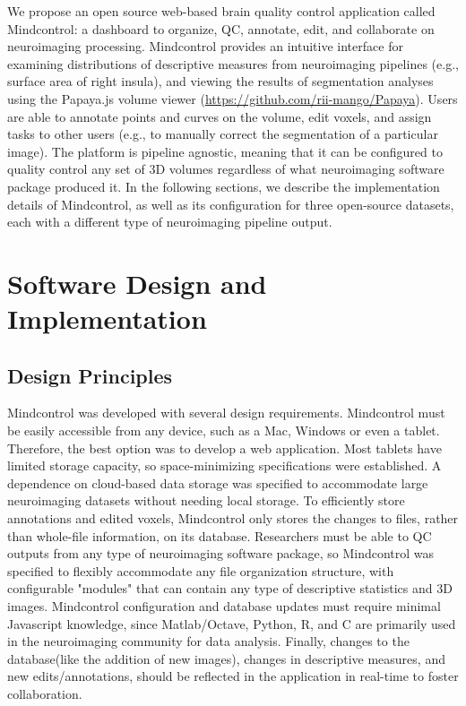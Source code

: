 We propose an open source web-based brain quality control application called Mindcontrol: a dashboard to organize, QC, annotate, edit, and collaborate on neuroimaging processing. Mindcontrol provides an intuitive interface for examining distributions of descriptive measures from neuroimaging pipelines (e.g., surface area of right insula), and viewing the results of segmentation analyses using the Papaya.js volume viewer (\href{https://github.com/rii-mango/Papaya}{https://github.com/rii-mango/Papaya}). Users are able to annotate points and curves on the volume, edit voxels, and assign tasks to other users (e.g., to manually correct the segmentation of a particular image). The platform is pipeline agnostic, meaning that it can be configured to quality control any set of 3D volumes regardless of what neuroimaging software package produced it. In the following sections, we describe the implementation details of Mindcontrol, as well as its configuration for three open-source datasets, each with a different type of neuroimaging pipeline output. 

\section{Software Design and Implementation}

\subsection{Design Principles}
Mindcontrol was developed with several design requirements. Mindcontrol must be easily accessible from any device, such as a Mac, Windows or even a tablet. Therefore, the best option was to develop a web application. Most tablets have limited storage capacity, so space-minimizing specifications were established. A dependence on cloud-based data storage was specified to accommodate large neuroimaging datasets without needing local storage. To efficiently store annotations and edited voxels, Mindcontrol only stores the changes to files, rather than whole-file information, on its database. Researchers must be able to QC outputs from any type of neuroimaging software package, so Mindcontrol was specified to flexibly accommodate any file organization structure, with configurable "modules" that can contain any type of descriptive statistics and 3D images. Mindcontrol configuration and database updates must require minimal Javascript knowledge, since Matlab/Octave, Python, R, and C are primarily used in the neuroimaging community for data analysis. Finally, changes to the database(like the addition of new images), changes in descriptive measures, and new edits/annotations, should be reflected in the application in real-time to foster collaboration.  


